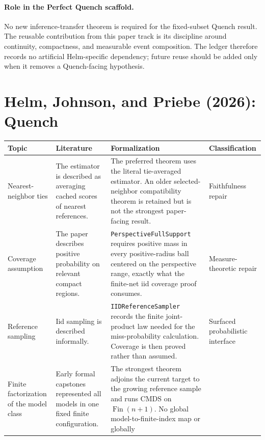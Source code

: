 \documentclass[11pt]{article}
\newcommand{\code}[1]{\texttt{#1}}
\begin{document}
\paragraph{Role in the Perfect Quench scaffold.}
No new inference-transfer theorem is required for the fixed-subset Quench
result.  The reusable contribution from this paper track is its discipline
around continuity, compactness, and measurable event composition.  The ledger
therefore records no artificial Helm-specific dependency; future reuse should
be added only when it removes a Quench-facing hypothesis.

\section{Helm, Johnson, and Priebe (2026): Quench}

\begin{longtable}{>{\raggedright\arraybackslash}p{}
                  >{\raggedright\arraybackslash}p{}
                  >{\raggedright\arraybackslash}p{}
                  >{\raggedright\arraybackslash}p{}}
\toprule
Topic & Literature & Formalization & Classification \\
\midrule
\endhead
Nearest-neighbor ties & The estimator is described as averaging cached scores
of nearest references. & The preferred theorem uses the literal tie-averaged
estimator.  An older selected-neighbor compatibility theorem is retained but is
not the strongest paper-facing result. & Faithfulness repair \\
\addlinespace
Coverage assumption & The paper describes positive probability on relevant
compact regions. & \code{PerspectiveFullSupport} requires positive mass in
every positive-radius ball centered on the perspective range, exactly what the
finite-net iid coverage proof consumes. & Measure-theoretic repair \\
\addlinespace
Reference sampling & Iid sampling is described informally. &
\code{IIDReferenceSampler} records the finite joint-product law needed for the
miss-probability calculation.  Coverage is then proved rather than assumed. &
Surfaced probabilistic interface \\
\addlinespace
Finite factorization of the model class & Early formal capstones represented all
models in one fixed finite configuration. & The strongest theorem adjoins the
current target to the growing reference sample and runs CMDS on
\(\operatorname{Fin}(n+1)\).  No global model-to-finite-index map or globally

\end{longtable}
\end{document}
